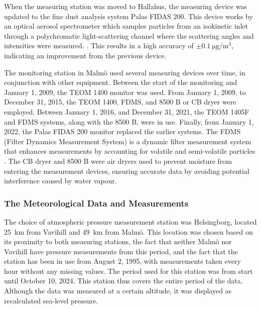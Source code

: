 When the measuring station was moved to Hallahus, the measuring device was updated to the fine dust analysis system Palas FIDAS 200. This device works by an optical aerosol spectrometer which samples particles from an isokinetic inlet through a polychromatic light-scattering channel where the scattering angles and intensities were measured. \cite{palasgmbhOperatingManualFidas}. This results in a high accuracy of $\pm\SI{0.1}{\micro\gram\per\meter\cubed}$, indicating an improvement from the previous device. 

The monitoring station in Malmö used several measuring devices over time, in conjunction with other equipment. Between the start of the monitoring and January 1, 2009, the TEOM 1400 monitor was used. From January 1, 2009, to December 31, 2015, the TEOM 1400, FDMS, and 8500 B or CB dryer were employed. Between January 1, 2016, and December 31, 2021, the TEOM 1405F and FDMS systems, along with the 8500 B, were in use. Finally, from January 1, 2022, the Palas FIDAS 200 monitor replaced the earlier systems. The FDMS (Filter Dynamics Measurement System) is a dynamic filter measurement system that enhances measurements by accounting for volatile and semi-volatile particles \cite{thermoscientific8500FDMSFilter2010}. The CB dryer and 8500 B were air dryers used to prevent moisture from entering the measurement devices, ensuring accurate data by avoiding potential interference caused by water vapour.

\subsubsection{The Meteorological Data and Measurements}
The choice of atmospheric pressure measurement station was Helsingborg, located \SI{25}{\km} from Vavihill and \SI{49}{\km} from Malmö. This location was chosen based on its proximity to both \PM measuring stations, the fact that neither Malmö nor Vavihill have pressure measurements from this period, and the fact that the station has been in use from August 2, 1995, with measurements taken every hour without any missing values. The period used for this station was from start until October 10, 2024. This station thus covers the entire period of the \PM data. Although the data was measured at a certain altitude, it was displayed as recalculated sea-level pressure.

